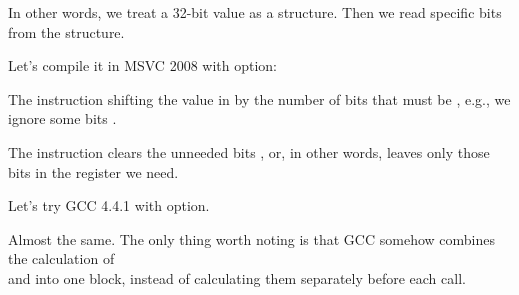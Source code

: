 In other words, we treat a 32-bit \Tint value as a structure.
Then we read specific bits from the structure.


Let's compile it in MSVC 2008 with \Ox option:




The  instruction shifting the value in \EAX by the number of bits that must be
, e.g., we ignore some bits .


The \AND instruction clears the unneeded bits , or, in other words, 
leaves only those bits in the \EAX register we need.




Let's try GCC 4.4.1 with \Othree option.



Almost the same.
The only thing worth noting is that GCC somehow combines the calculation of\\
 and  into one block,
instead of calculating them separately before each \printf call.
